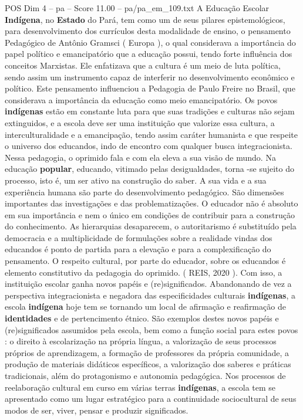 \begin{textsample}{POS Dim 4 – pa – Score 11.00 – pa/pa\_em\_109.txt}
A Educação Escolar \textbf{Indígena}, no \textbf{Estado} do Pará, tem como um de seus pilares epistemológicos, para desenvolvimento dos currículos desta modalidade de ensino, o pensamento Pedagógico de Antônio Gramsci ( Europa ), o qual considerava a importância do papel político e emancipatório que a educação possui, tendo forte influência dos conceitos Marxistas.
Ele enfatizava que a cultura é um meio de luta política, sendo assim um instrumento capaz de interferir no desenvolvimento econômico e político.
Este pensamento influenciou a Pedagogia de Paulo Freire no Brasil, que considerava a importância da educação como meio emancipatório.
Os povos \textbf{indígenas} estão em constante luta para que suas tradições e culturas não sejam extinguidos, e a escola deve ser uma instituição que valorize essa cultura, a interculturalidade e a emancipação, tendo assim caráter humanista e que respeite o universo dos educandos, indo de encontro com qualquer busca integracionista.
Nessa pedagogia, o oprimido fala e com ela eleva a sua visão de mundo.
Na educação \textbf{popular}, educando, vitimado pelas desigualdades, torna -se sujeito do processo, isto é, um ser ativo na construção do saber.
A sua vida e a sua experiência humana são parte do desenvolvimento pedagógico.
São dimensões importantes das investigações e das problematizações.
O educador não é absoluto em sua importância e nem o único em condições de contribuir para a construção do conhecimento.
As hierarquias desaparecem, o autoritarismo é substituído pela democracia e a multiplicidade de formulações sobre a realidade vindas dos educandos é ponto de partida para a elevação e para a complexificação do pensamento.
O respeito cultural, por parte do educador, sobre os educandos é elemento constitutivo da pedagogia do oprimido. ( REIS, 2020 ).
Com isso, a instituição escolar ganha novos papéis e (re)significados.
Abandonando de vez a perspectiva integracionista e negadora das especificidades culturais \textbf{indígenas}, a escola \textbf{indígena} hoje tem se tornando um local de afirmação e reafirmação de \textbf{identidades} e de pertencimento étnico.
São exemplos destes novos papéis e (re)significados assumidos pela escola, bem como a função social para estes povos : o direito à escolarização na própria língua, a valorização de seus processos próprios de aprendizagem, a formação de professores da própria comunidade, a produção de materiais didáticos específicos, a valorização dos saberes e práticas tradicionais, além do protagonismo e autonomia pedagógica.
Nos processos de reelaboração cultural em curso em várias terras \textbf{indígenas}, a escola tem se apresentado como um lugar estratégico para a continuidade sociocultural de seus modos de ser, viver, pensar e produzir significados.

\end{textsample}
